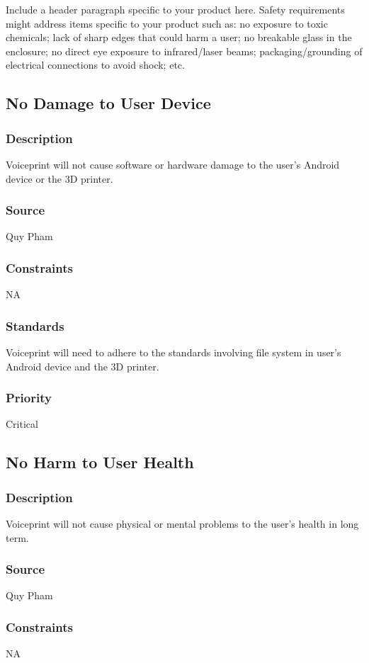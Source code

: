 Include a header paragraph specific to your product here. Safety requirements might address items specific to your product such as: no exposure to toxic chemicals; lack of sharp edges that could harm a user; no breakable glass in the enclosure; no direct eye exposure to infrared/laser beams; packaging/grounding of electrical connections to avoid shock; etc.

\subsection{No Damage to User Device}
\subsubsection{Description}
Voiceprint will not cause software or hardware damage to the user's Android device or the 3D printer.
\subsubsection{Source}
Quy Pham
\subsubsection{Constraints}
NA
\subsubsection{Standards}
Voiceprint will need to adhere to the standards involving file system in user's Android device and the 3D printer.
\subsubsection{Priority}
Critical

\subsection{No Harm to User Health}
\subsubsection{Description}
Voiceprint will not cause physical or mental problems to the user's health in long term.
\subsubsection{Source}
Quy Pham
\subsubsection{Constraints}
NA
